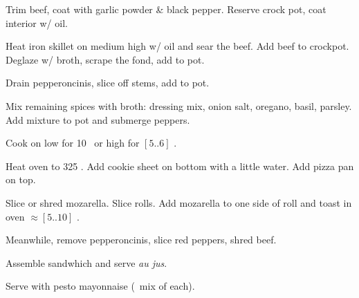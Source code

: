 \begin{preparation}
\item Trim beef, coat with garlic powder \& black pepper.
    Reserve crock pot, coat interior w/ oil.

\item Heat iron skillet on medium high w/ oil and sear the beef.
    Add beef to crockpot.
    Deglaze w/ broth, scrape the fond, add to pot.

\item Drain pepperoncinis, slice off stems, add to pot.

\item Mix remaining spices with broth: dressing mix, onion salt, oregano,
    basil, parsley.
    Add mixture to pot and submerge peppers.

\item Cook on low for 10 \hour~or high for $[5..6]$ \hour.

\item Heat oven to 325 \Fahrenheit.
    Add cookie sheet on bottom with a little water.
    Add pizza pan on top.

\item Slice or shred mozarella.
    Slice rolls.
    Add mozarella to one side of roll and toast in oven $\approx[5..10]$ \minute.

\item Meanwhile, remove pepperoncinis, slice red peppers, shred beef.

\item Assemble sandwhich and serve \textit{au jus}.
\end{preparation}

\begin{variation}
\item Serve with pesto mayonnaise (\onehalf~mix of each).
\end{variation}

\recipeend%
